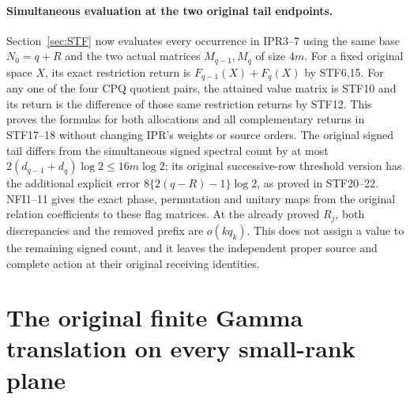 \documentclass[11pt,a4paper]{article}
\begin{document}
\paragraph{Simultaneous evaluation at the two original tail endpoints.}
Section~\ref{sec:STF} now evaluates every occurrence in IPR3--7 using
the same base $N_0=q+R$ and the two actual matrices $M_{q-1},M_q$
of size $4m$. For a fixed original space $X$, its exact restriction
return is $F_{q-1}(X)+F_q(X)$ by STF6,15. For any one of the four
CPQ quotient pairs, the attained value matrix is STF10 and its return
is the difference of those same restriction returns by STF12.
This proves the formulas for both allocations and all complementary
returns in STF17--18 without changing IPR's weights or source orders.
The original signed tail differs from the simultaneous signed spectral
count by at most $2(d_{q-1}+d_q)\log2\le16m\log2$; its original
successive-row threshold version has the additional explicit error
$8\{2(q-R)-1\}\log2$, as proved in STF20--22.
NFI1--11 gives the exact phase, permutation and unitary maps from
the original relation coefficients to these flag matrices. At the
already proved $R_j$, both discrepancies and the removed prefix are
$o(kq_k)$. This does not assign a value to the remaining signed
count, and it leaves the independent proper source and complete
action at their original receiving identities.

\label{MTBUILD:IPR_SIMULTANEOUS_RECEIVER:end}

\appendix

\clearpage
\label{MTBUILD:SGT_COMPLETE_PREREQUISITE:start}
\clearpage
\begingroup
\providecommand{\im}{\operatorname{im}}
\providecommand{\rank}{\operatorname{rank}}
\section{The original finite Gamma translation on every small-rank plane}
\label{sec:SGT}
\end{document}
